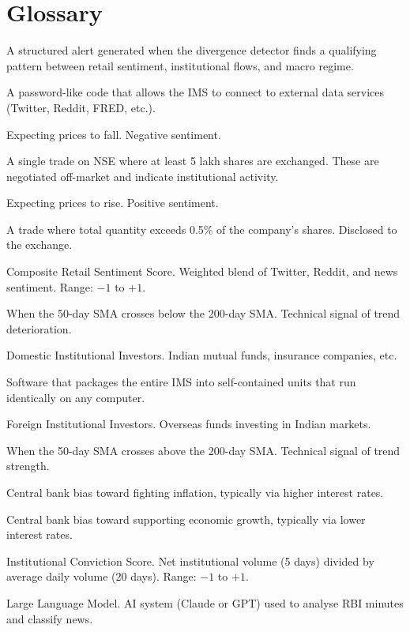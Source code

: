 \documentclass[12pt, a4paper]{report}
\begin{document}
\chapter{Glossary}

\begin{description}[style=nextline, leftmargin=3cm]
\item[Alpha Signal] A structured alert generated when the divergence detector finds a qualifying pattern between retail sentiment, institutional flows, and macro regime.
\item[API Key] A password-like code that allows the IMS to connect to external data services (Twitter, Reddit, FRED, etc.).
\item[Bearish] Expecting prices to fall. Negative sentiment.
\item[Block Deal] A single trade on NSE where at least 5 lakh shares are exchanged. These are negotiated off-market and indicate institutional activity.
\item[Bullish] Expecting prices to rise. Positive sentiment.
\item[Bulk Deal] A trade where total quantity exceeds 0.5\% of the company's shares. Disclosed to the exchange.
\item[CRSS] Composite Retail Sentiment Score. Weighted blend of Twitter, Reddit, and news sentiment. Range: $-1$ to $+1$.
\item[Death Cross] When the 50-day SMA crosses below the 200-day SMA. Technical signal of trend deterioration.
\item[DII] Domestic Institutional Investors. Indian mutual funds, insurance companies, etc.
\item[Docker] Software that packages the entire IMS into self-contained units that run identically on any computer.
\item[FII] Foreign Institutional Investors. Overseas funds investing in Indian markets.
\item[Golden Cross] When the 50-day SMA crosses above the 200-day SMA. Technical signal of trend strength.
\item[Hawkish] Central bank bias toward fighting inflation, typically via higher interest rates.
\item[Dovish] Central bank bias toward supporting economic growth, typically via lower interest rates.
\item[ICS] Institutional Conviction Score. Net institutional volume (5 days) divided by average daily volume (20 days). Range: $-1$ to $+1$.
\item[LLM] Large Language Model. AI system (Claude or GPT) used to analyse RBI minutes and classify news.

\end{description}
\end{document}
